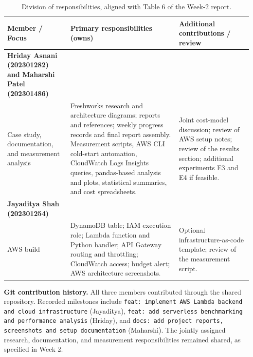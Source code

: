 \documentclass[10pt,a4paper]{article}
\begin{document}
\begin{table}[H]
\centering
\caption{Division of responsibilities, aligned with Table 6 of the Week-2 report.}
\label{tab:team_contributions}
\small
\renewcommand{\arraystretch}{1.18}
\begin{tabularx}{\textwidth}{>{\raggedright\arraybackslash}p{3.3cm} >{\raggedright\arraybackslash}X >{\raggedright\arraybackslash}p{3.25cm}}
\toprule
\textbf{Member / Focus} & \textbf{Primary responsibilities (owns)} & \textbf{Additional contributions / review} \\
\midrule
\textbf{Hriday Asnani (202301282) and Maharshi Patel (202301486)}\\
Case study, documentation, and measurement analysis
& Freshworks research and architecture diagrams; reports and references; weekly progress records and final report assembly. Measurement scripts, AWS CLI cold-start automation, CloudWatch Logs Insights queries, pandas-based analysis and plots, statistical summaries, and cost spreadsheets.
& Joint cost-model discussion; review of AWS setup notes; review of the results section; additional experiments E3 and E4 if feasible. \\
\midrule
\textbf{Jayaditya Shah (202301254)}\\
AWS build
& DynamoDB table; IAM execution role; Lambda function and Python handler; API Gateway routing and throttling; CloudWatch access; budget alert; AWS architecture screenshots.
& Optional infrastructure-as-code template; review of the measurement script. \\
\bottomrule
\end{tabularx}
\end{table}

\noindent\textbf{Git contribution history.} All three members contributed through the shared repository. Recorded milestones include \texttt{feat: implement AWS Lambda backend and cloud infrastructure} (Jayaditya), \texttt{feat: add serverless benchmarking and performance analysis} (Hriday), and \texttt{docs: add project reports, screenshots and setup documentation} (Maharshi). The jointly assigned research, documentation, and measurement responsibilities remained shared, as specified in Week 2.
\end{document}
